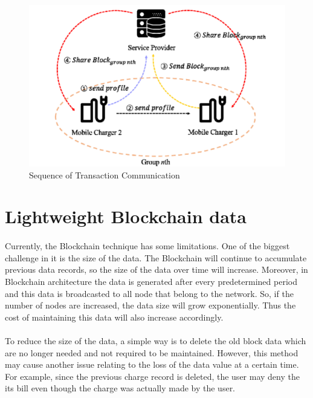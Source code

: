 \begin{figure}[H]
	\centering
	\includegraphics[scale=0.39]{transaction_communication.png}
	\caption{Sequence of Transaction Communication}
\end{figure}

\section{Lightweight Blockchain data}
\paragraph{}Currently, the Blockchain technique has some limitations.
One of the biggest challenge in it is the size of the data. The
Blockchain will continue to accumulate previous data records,
so the size of the data over time will increase. Moreover, in
Blockchain architecture the data is generated after every predetermined
period and this data is broadcasted to all node that
belong to the network. So, if the number of nodes are
increased, the data size will grow exponentially. Thus the cost
of maintaining this data will also increase accordingly.
\paragraph{}
To reduce the size of the data, a simple way is to delete the
old block data which are no longer needed and not required to
be maintained. However, this method may cause another issue
relating to the loss of the data value at a certain time. For
example, since the previous charge record is deleted, the user
may deny the its bill even though the charge was actually made
by the user.

